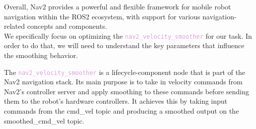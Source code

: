 Overall, Nav2 provides a powerful and flexible framework for mobile robot navigation within the ROS2 ecosystem, with support for various navigation-related concepts and components. \\


We specifically focus on optimizing the \textcolor{Plum}{\texttt{nav2\_velocity\_smoother}} for our task. In order to do that, we will need to understand the key parameters that influence the smoothing behavior. 

The \textcolor{Plum}{\texttt{nav2\_velocity\_smoother}} is a lifecycle-component node that is part of the Nav2 navigation stack. Its main purpose is to take in velocity commands from Nav2's controller server and apply smoothing to these commands before sending them to the robot's hardware controllers. It achieves this by taking input commands from the cmd\_vel topic and producing a smoothed output on the smoothed\_cmd\_vel topic.\\

